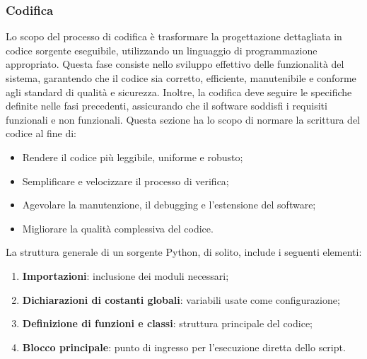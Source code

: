 \subsubsection{Codifica}
Lo scopo del processo di codifica è trasformare la progettazione dettagliata in codice sorgente eseguibile, utilizzando un linguaggio di programmazione appropriato. Questa fase consiste nello sviluppo effettivo delle funzionalità del sistema, garantendo che il codice sia corretto, efficiente, manutenibile e conforme agli standard di qualità e sicurezza. Inoltre, la codifica deve seguire le specifiche definite nelle fasi precedenti, assicurando che il software soddisfi i requisiti funzionali e non funzionali. Questa sezione ha lo scopo di normare la scrittura del codice al fine di:
\begin{itemize}
    \item Rendere il codice più leggibile, uniforme e robusto;
    \item Semplificare e velocizzare il processo di verifica;
    \item Agevolare la manutenzione, il debugging e l'estensione del software;
    \item Migliorare la qualità complessiva del codice.
\end{itemize}

La struttura generale di un sorgente Python, di solito, include i seguenti elementi:
\begin{enumerate}
    \item \textbf{Importazioni}: inclusione dei moduli necessari;
    \item \textbf{Dichiarazioni di costanti globali}: variabili usate come configurazione;
    \item \textbf{Definizione di funzioni e classi}: struttura principale del codice;
    \item \textbf{Blocco principale}: punto di ingresso per l'esecuzione diretta dello script.
\end{enumerate}

